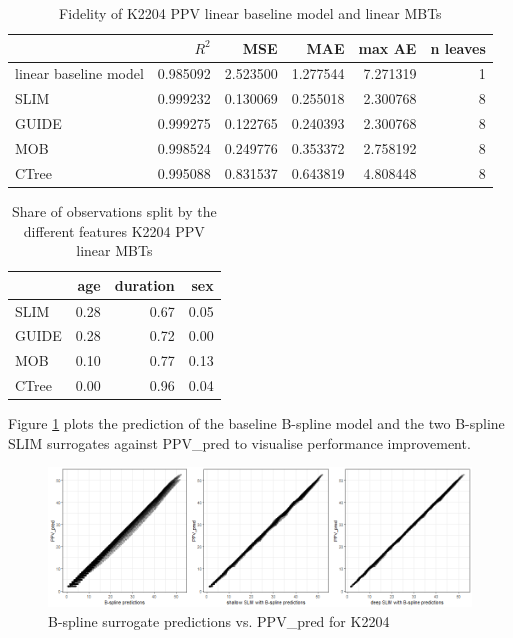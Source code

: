 \begin{table}[!htb]
\centering \scriptsize
\begin{tabular}[t]{l|r|r|r|r|r}
\hline
  & $R^2$ & MSE & MAE & max AE & n leaves\\
\hline
linear baseline model & 0.985092 & 2.523500 & 1.277544 & 7.271319 & 1\\
\hline
SLIM & 0.999232 & 0.130069 & 0.255018 & 2.300768 & 8\\
GUIDE & 0.999275 & 0.122765 & 0.240393 & 2.300768 & 8\\
MOB & 0.998524 & 0.249776 & 0.353372 & 2.758192 & 8\\
CTree & 0.995088 & 0.831537 & 0.643819 & 4.808448 & 8\\
\hline
\end{tabular}
\label{tab:ins_k2204_ppv_lm_surrogates_perf}
\caption{Fidelity of K2204 PPV linear baseline model and linear MBTs}
\end{table}


\begin{table}[!htb]
\centering \scriptsize
\begin{tabular}[t]{l|r|r|r}
\hline
& age & duration & sex\\
\hline
SLIM & 0.28 & 0.67 & 0.05\\
GUIDE & 0.28 & 0.72 & 0.00\\
MOB & 0.10 & 0.77 & 0.13\\
CTree & 0.00 & 0.96 & 0.04\\
\hline
\end{tabular}
\label{tab:ins_k2204_ppv_lm_surrogates_share}
\caption{Share of observations split by the different features K2204 PPV linear MBTs}
\end{table}



Figure \ref{fig:ins_k2204_ppv_fit} plots the prediction of the baseline B-spline model and the two B-spline SLIM surrogates against PPV\_pred to visualise performance improvement. 

\begin{figure}[!htb]
    \centering    
    \includegraphics[width = 14cm]{Figures/insurance_use_case/k2204_PPV/fit.png}
    \caption{B-spline surrogate predictions vs. PPV\_pred for K2204}
    \label{fig:ins_k2204_ppv_fit}
\end{figure}

